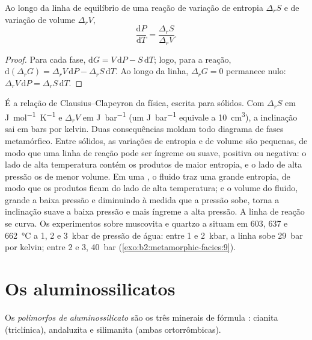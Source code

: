 \begin{proposition}\label{prop:b2:metamorphic-facies:clapeyron}
Ao longo da linha de equilíbrio de uma reação de variação de entropia $\Delta_r S$ e de variação
de volume $\Delta_r V$,
\[
\frac{\mathrm dP}{\mathrm dT} = \frac{\Delta_r S}{\Delta_r V}.
\]
\end{proposition}

\begin{proof}
Para cada fase, $\mathrm dG = V\,\mathrm dP - S\,\mathrm dT$; logo, para a reação,
$\mathrm d(\Delta_r G) = \Delta_r V\,\mathrm dP - \Delta_r S\,\mathrm dT$. Ao longo da linha,
$\Delta_r G = 0$ permanece nulo: $\Delta_r V\,\mathrm dP = \Delta_r S\,\mathrm dT$.
\end{proof}

É a relação de Clausius--Clapeyron da física, escrita para sólidos. Com
$\Delta_r S$ em \unit{J.mol^{-1}.K^{-1}} e $\Delta_r V$ em \unit{J.bar^{-1}} (um
\unit{J.bar^{-1}} equivale a \qty{10}{cm^3}), a inclinação sai em bars por kelvin. Duas
consequências moldam todo diagrama de fases metamórfico. Entre sólidos, as variações de entropia e de volume
são pequenas, de modo que uma linha de reação pode ser íngreme ou suave, positiva ou
negativa: o lado de alta temperatura contém os produtos de maior entropia, e o
lado de alta pressão os de menor volume. Em uma , o fluido
traz uma grande entropia, de modo que os produtos ficam do lado de alta temperatura; e o volume
do fluido, grande a baixa pressão e diminuindo à medida que a pressão sobe, torna a inclinação
suave a baixa pressão e mais íngreme a alta pressão. A linha de reação se curva.
Os experimentos sobre muscovita e quartzo a situam em 603, 637 e \qty{662}{\celsius} a 1,
2 e \qty{3}{kbar} de pressão de água: entre 1 e \qty{2}{kbar}, a linha sobe
\qty{29}{bar} por kelvin; entre 2 e 3, \qty{40}{bar} (\cref{exo:b2:metamorphic-facies:9}).

\section{Os aluminossilicatos}\label{sec:b2:metamorphic-facies:al2sio5}

\begin{definition}\label{def:b2:metamorphic-facies:al2sio5}
Os \emph{polimorfos de aluminossilicato} são os três
minerais de fórmula : cianita (triclínica), andaluzita e silimanita (ambas
ortorrômbicas).
\end{definition}

